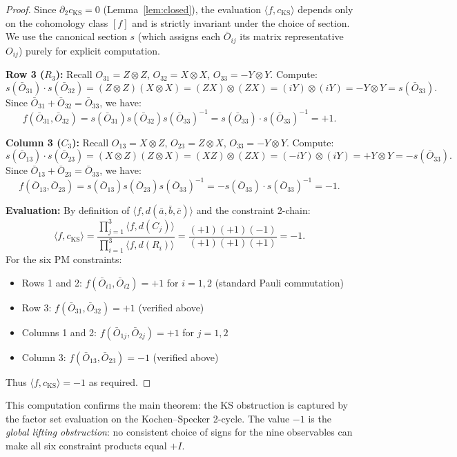 \documentclass[11pt]{article}
\begin{document}
\begin{proof}
Since $\partial_2 c_{\mathrm{KS}} = 0$ (Lemma~\ref{lem:closed}), the evaluation $\langle f, c_{\mathrm{KS}} \rangle$ depends only on the cohomology class $[f]$ and is strictly invariant under the choice of section. We use the canonical section $s$ (which assigns each $\bar{O}_{ij}$ its matrix representative $O_{ij}$) purely for explicit computation.

\textbf{Row 3 ($R_3$):} Recall $O_{31} = Z \otimes Z$, $O_{32} = X \otimes X$,
$O_{33} = -Y \otimes Y$. Compute:
\[
s(\bar{O}_{31}) \cdot s(\bar{O}_{32}) = (Z \otimes Z)(X \otimes X)
= (ZX) \otimes (ZX) = (iY) \otimes (iY) = -Y \otimes Y = s(\bar{O}_{33}).
\]
Since $\bar{O}_{31} + \bar{O}_{32} = \bar{O}_{33}$, we have:
\[
  f(\bar{O}_{31}, \bar{O}_{32}) = s(\bar{O}_{31})s(\bar{O}_{32})s(\bar{O}_{33})^{-1}
  = s(\bar{O}_{33}) \cdot s(\bar{O}_{33})^{-1} = +1.
\]

\textbf{Column 3 ($C_3$):} Recall $O_{13} = X \otimes Z$, $O_{23} = Z \otimes X$,
$O_{33} = -Y \otimes Y$. Compute:
\[
s(\bar{O}_{13}) \cdot s(\bar{O}_{23}) = (X \otimes Z)(Z \otimes X)
= (XZ) \otimes (ZX) = (-iY) \otimes (iY) = +Y \otimes Y = -s(\bar{O}_{33}).
\]
Since $\bar{O}_{13} + \bar{O}_{23} = \bar{O}_{33}$, we have:
\[
  f(\bar{O}_{13}, \bar{O}_{23}) = s(\bar{O}_{13})s(\bar{O}_{23})s(\bar{O}_{33})^{-1}
  = -s(\bar{O}_{33}) \cdot s(\bar{O}_{33})^{-1} = -1.
\]

\textbf{Evaluation:}
By definition of $\langle f, d(\bar{a},\bar{b},\bar{c}) \rangle$
and the constraint 2-chain:
\[
  \langle f, c_{\mathrm{KS}} \rangle
  = \frac{\prod_{j=1}^3 \langle f, d(C_j) \rangle}{\prod_{i=1}^3 \langle f, d(R_i) \rangle}
  = \frac{(+1)(+1)(-1)}{(+1)(+1)(+1)}
  = -1.
\]
For the six PM constraints:
\begin{itemize}
    \item Rows 1 and 2: $f(\bar{O}_{i1}, \bar{O}_{i2}) = +1$ for $i=1,2$ (standard Pauli commutation)
    \item Row 3: $f(\bar{O}_{31}, \bar{O}_{32}) = +1$ (verified above)
    \item Columns 1 and 2: $f(\bar{O}_{1j}, \bar{O}_{2j}) = +1$ for $j=1,2$
    \item Column 3: $f(\bar{O}_{13}, \bar{O}_{23}) = -1$ (verified above)
\end{itemize}
Thus $\langle f, c_{\mathrm{KS}} \rangle = -1$ as required.
\end{proof}

This computation confirms the main theorem: the KS obstruction is
captured by the factor set evaluation on the Kochen--Specker 2-cycle.
The value $-1$ is the \emph{global lifting obstruction}: no consistent
choice of signs for the nine observables can make all six constraint
products equal $+I$.
\end{document}
